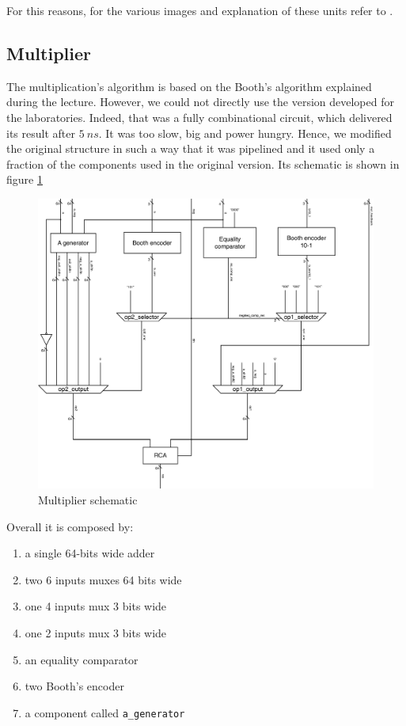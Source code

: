 For this reasons, for the various images and explanation of these units refer to \cite{ln}.

\subsection{Multiplier}

The multiplication's algorithm is based on the Booth's algorithm explained during the lecture. However, we could not directly use the version developed for the laboratories.
Indeed, that was a fully combinational circuit, which delivered its result after $5\ ns$. It was too slow, big and power hungry. Hence, we modified the original structure in such
a way that it was pipelined and it used only a fraction of the components used in the original version. Its schematic is shown in figure \ref{fig:mul}

\begin{figure}[!ht]
	\centering
	\includegraphics[width=0.8\linewidth]{./chapters/figures/mult.pdf}
	\caption{Multiplier schematic}
	\label{fig:mul}
\end{figure}

Overall it is composed by:

\begin{enumerate}
    \item a single 64-bits wide adder
    \item two 6 inputs muxes 64 bits wide
    \item one 4 inputs mux 3 bits wide
    \item one 2 inputs mux 3 bits wide
    \item an equality comparator
    \item two Booth's encoder
    \item a component called \verb|a_generator|
\end{enumerate}

